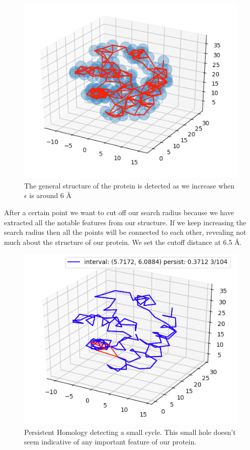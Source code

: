 \documentclass[12pt, a4paper, twocolumn, fullpage]{article}
\theoremstyle{plain}
\theoremstyle{definition}
\theoremstyle{remark}
\begin{document}
\begin{figure}[H]
    \includegraphics[width=\linewidth]{img/hom/ballRad3.png}
    \caption{The general structure of the protein is detected as we increase when $\epsilon$ is around 6 Å}
    \label{ballRad3}
\end{figure}

After a certain point we want to cut off our search radius because we have extracted all the notable features from our structure. If we keep increasing the search radius then all the points will be connected to each other, revealing not much about the structure of our protein. We set the cutoff distance at 6.5 Å.

\begin{figure}[H]
    \includegraphics[width=\linewidth]{img/hom/Simplex1.png}
    \caption{Persistent Homology detecting a small cycle. This small hole doesn't seem indicative of any important feature of our protein. }
    \label{Simplex1}
\end{figure}
\end{document}
